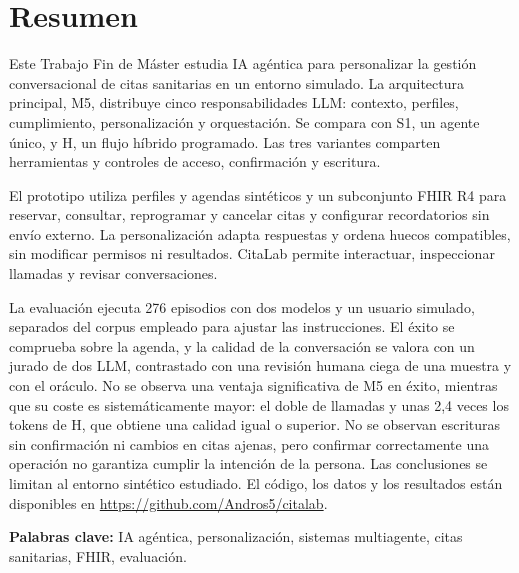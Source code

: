 \chapter*{Resumen}

Este Trabajo Fin de Máster estudia IA agéntica para personalizar la gestión
conversacional de citas sanitarias en un entorno simulado. La arquitectura
principal, M5, distribuye cinco responsabilidades LLM: contexto, perfiles,
cumplimiento, personalización y orquestación. Se compara con S1, un agente
único, y H, un flujo híbrido programado. Las tres variantes comparten
herramientas y controles de acceso, confirmación y escritura.

El prototipo utiliza perfiles y agendas sintéticos y un subconjunto FHIR R4
para reservar, consultar, reprogramar y cancelar citas y configurar
recordatorios sin envío externo. La personalización adapta respuestas y
ordena huecos compatibles, sin modificar permisos ni resultados. CitaLab
permite interactuar, inspeccionar llamadas y revisar conversaciones.

La evaluación ejecuta 276 episodios con dos modelos y un usuario simulado,
separados del corpus empleado para ajustar las instrucciones. El éxito se
comprueba sobre la agenda, y la calidad de la conversación se valora con un
jurado de dos LLM, contrastado con una revisión humana ciega de una muestra y
con el oráculo. No se observa una ventaja significativa de M5 en éxito, mientras que
su coste es sistemáticamente mayor: el doble de llamadas y unas 2,4 veces los
tokens de H, que obtiene una calidad igual o superior. No se observan
escrituras sin confirmación ni cambios en citas ajenas, pero confirmar
correctamente una operación no garantiza cumplir la intención de la persona. Las conclusiones se limitan al
entorno sintético estudiado. El código, los
datos y los resultados están disponibles en \url{https://github.com/Andros5/citalab}.

\vspace{1em}
\noindent\textbf{Palabras clave:} IA agéntica, personalización, sistemas
multiagente, citas sanitarias, FHIR, evaluación.
